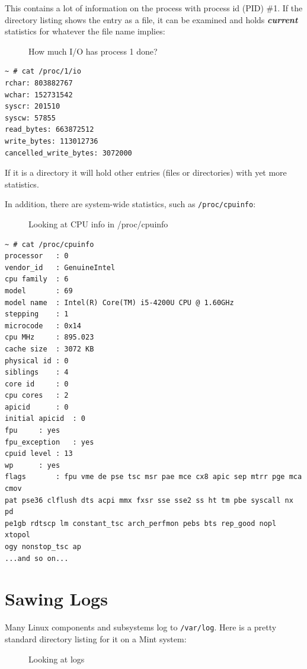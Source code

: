 \documentclass[10pt,]{book}
\numberwithin{figure}{chapter}
\DeclareRobustCommand{\drcap}[1]{\begin{figure}[H]\caption{#1}\end{figure}}
\begin{document}
This contains a lot of information on the process with process id (PID)
\#1. If the directory listing shows the entry as a file, it can be
examined and holds \textbf{\emph{current}} statistics for whatever the
file name implies:

\drcap{How much I/O has process 1 done?}

\begin{verbatim}
~ # cat /proc/1/io
rchar: 803882767
wchar: 152731542
syscr: 201510
syscw: 57855
read_bytes: 663872512
write_bytes: 113012736
cancelled_write_bytes: 3072000
\end{verbatim}

If it is a directory it will hold other entries (files or directories)
with yet more statistics.

In addition, there are system-wide statistics, such as
\texttt{/proc/cpuinfo}:

\drcap{Looking at CPU info in /proc/cpuinfo}

\begin{verbatim}
~ # cat /proc/cpuinfo 
processor   : 0
vendor_id   : GenuineIntel
cpu family  : 6
model       : 69
model name  : Intel(R) Core(TM) i5-4200U CPU @ 1.60GHz
stepping    : 1
microcode   : 0x14
cpu MHz     : 895.023
cache size  : 3072 KB
physical id : 0
siblings    : 4
core id     : 0
cpu cores   : 2
apicid      : 0
initial apicid  : 0
fpu     : yes
fpu_exception   : yes
cpuid level : 13
wp      : yes
flags       : fpu vme de pse tsc msr pae mce cx8 apic sep mtrr pge mca cmov 
pat pse36 clflush dts acpi mmx fxsr sse sse2 ss ht tm pbe syscall nx pd
pe1gb rdtscp lm constant_tsc arch_perfmon pebs bts rep_good nopl xtopol
ogy nonstop_tsc ap
...and so on...
\end{verbatim}

\section*{Sawing Logs}\label{sawing-logs}

Many Linux components and subsystems log to \texttt{/var/log}. Here is a
pretty standard directory listing for it on a Mint system:

\drcap{Looking at logs}
\end{document}

